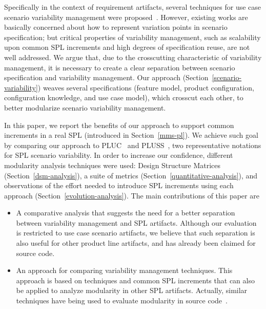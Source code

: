 \documentclass{acm_proc_article-sp}
\begin{document}
Specifically in the context of requirement artifacts, several techniques for use case scenario variability management were proposed~\cite{favaro-icsr-98,bertolino-esec-2003,fantechi-splc-2004,eriksson-splc-2005}. However, existing works are basically concerned about how to represent variation points in scenario specification; but critical properties of variability management, such as scalability upon common SPL increments and high degrees of specification reuse, are not well addressed. We argue that, due to the crosscutting characteristic of variability management, it is necessary to create a clear separation between scenario specification and variability management. Our approach (Section~\ref{scenario-variability}) weaves several specifications (feature model, product configuration, configuration knowledge, and use case model), which crosscut each other, to better modularize scenario variability management. 

In this paper, we report the benefits of our approach to support common increments in a real SPL (introduced in Section~\ref{mms-pl}). We achieve such goal by comparing our approach to PLUC~\cite{bertolino-esec-2003} and PLUSS~\cite{eriksson-splc-2005}, two representative notations for SPL scenario variability. In order to increase our confidence, different modularity analysis techniques were used: Design Structure Matrices (Section~\ref{dsm-analysis}), a suite of metrics (Section~\ref{quantitative-analysis}), and observations of the effort needed to introduce SPL increments using each approach (Section~\ref{evolution-analysis}). The main contributions of this paper are

\begin{itemize}
\item A comparative analysis that suggests the need for a better separation between variability management and SPL artifacts. Although our evaluation is restricted to use case scenario artifacts, we believe that such separation is also useful for other product line artifacts, and has already been claimed for source code\cite{alves-gpce-06,mmedeiros-lawasp-2007}.

\item An approach for comparing variability management techniques. This approach is based on techniques and common SPL increments that can also be applied to analyze modularity in other SPL artifacts. Actually, similar techniques have being used to evaluate modularity in source code~\cite{vlopes-aosd-2005, sullivan-fse-2005,garcia-taosd-2005, greenwood-ecoop-2007}.   

\end{itemize}
\end{document}
